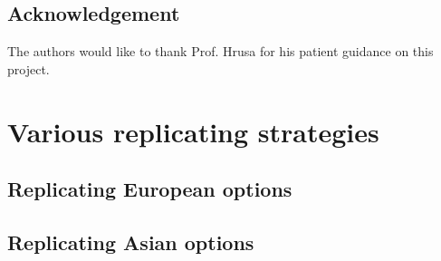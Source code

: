 \documentclass[reqno]{amsart}
\begin{document}
\subsection*{Acknowledgement} The authors would like to thank Prof. Hrusa for his patient guidance on this project.  


\appendix
\section{Various replicating strategies}

\subsection{Replicating European options}

\subsection{Replicating Asian options}

\end{document}
